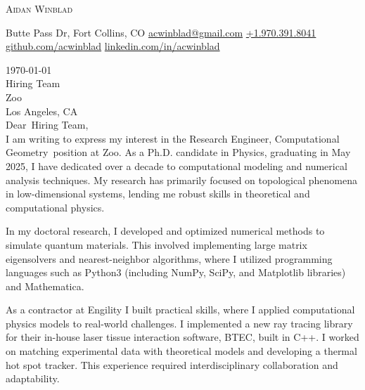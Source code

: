 \documentclass[12pt]{letter}
\makeatletter
\newcommand{\myname}{Aidan Winblad} %
\newcommand{\myemail}{acwinblad@gmail.com} %
\newcommand{\mylinkedin}{acwinblad} %
\newcommand{\mygithub}{acwinblad} %
\newcommand{\myphone}{+1.970.391.8041} %
\newcommand{\mylocation}{1007 Butte Pass Dr, Fort Collins, CO} %
\newcommand{\recipient}{Hiring Team} %
\newcommand{\greeting}{Dear} %
\newcommand{\position}{Research Engineer, Computational Geometry} %
\newcommand{\company}{Zoo} %
\newcommand{\street}{} %
\newcommand{\city}{Los Angeles} %
\newcommand{\state}{CA} %
\newcommand{\zip}{} %
\makeatother
\begin{document}
\AddToShipoutPictureBG{%
\color{gr}
\AtPageUpperLeft{\rule[-1.4in]{\paperwidth}{1.3in}}
}

\begin{center}
{\fontsize{28}{0}\selectfont\scshape \myname}

\faMapMarker\enspace\mylocation\hfill
\href{mailto:\myemail}{\faEnvelope\enspace \myemail}\hfill
\href{tel:\myphone}{\faPhone\enspace \myphone}\hfill
\href{https://github.com/\mygithub}{\faGithubSquare\enspace github.com/\mygithub}\hfill
\href{https://linkedin.com/in/\mylinkedin}{\faLinkedinIn\enspace linkedin.com/in/\mylinkedin}\hfill
\end{center}

\vspace{0.2in}

\today\\

\vspace{-0.1in}\recipient\\
\company\\
\city, \state\\%

\vspace{-0.1in}\greeting\ \recipient,\\

\vspace{-0.1in}\setlength\parindent{24pt}
I am writing to express my interest in the \position\ position at \company.
As a Ph.D. candidate in Physics, graduating in May 2025, I have dedicated over a decade to computational modeling and numerical analysis techniques.
My research has primarily focused on topological phenomena in low-dimensional systems, lending me robust skills in theoretical and computational physics.

In my doctoral research, I developed and optimized numerical methods to simulate quantum materials.
This involved implementing large matrix eigensolvers and nearest-neighbor algorithms, where I utilized programming languages such as Python3 (including NumPy, SciPy, and Matplotlib libraries) and Mathematica.

As a contractor at Engility I built practical skills, where I applied computational physics models to real-world challenges.
I implemented a new ray tracing library for their in-house laser tissue interaction software, BTEC, built in C++.
I worked on matching experimental data with theoretical models and developing a thermal hot spot tracker.
This experience required interdisciplinary collaboration and adaptability.
\end{document}
